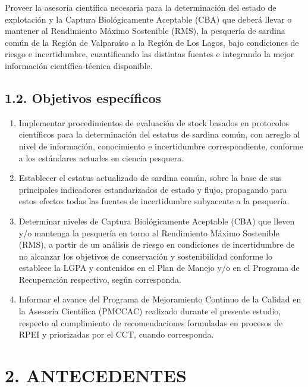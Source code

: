\documentclass[
  spanish,
]{article}
\begin{document}
Proveer la asesoría científica necesaria para la determinación del
estado de explotación y la Captura Biológicamente Aceptable (CBA) que
deberá llevar o mantener al Rendimiento Máximo Sostenible (RMS), la
pesquería de sardina común de la Región de Valparaíso a la Región de Los
Lagos, bajo condiciones de riesgo e incertidumbre, cuantificando las
distintas fuentes e integrando la mejor información científica-técnica
disponible.

\hypertarget{objetivos-especuxedficos}{%
\subsection{1.2. Objetivos específicos}\label{objetivos-especuxedficos}}

\begin{enumerate}
\def\labelenumi{\arabic{enumi}.}
\item
  Implementar procedimientos de evaluación de stock basados en
  protocolos científicos para la determinación del estatus de sardina
  común, con arreglo al nivel de información, conocimiento e
  incertidumbre correspondiente, conforme a los estándares actuales en
  ciencia pesquera.
\item
  Establecer el estatus actualizado de sardina común, sobre la base de
  sus principales indicadores estandarizados de estado y flujo,
  propagando para estos efectos todas las fuentes de incertidumbre
  subyacente a la pesquería.
\item
  Determinar niveles de Captura Biológicamente Aceptable (CBA) que
  lleven y/o mantenga la pesquería en torno al Rendimiento Máximo
  Sostenible (RMS), a partir de un análisis de riesgo en condiciones de
  incertidumbre de no alcanzar los objetivos de conservación y
  sostenibilidad conforme lo establece la LGPA y contenidos en el Plan
  de Manejo y/o en el Programa de Recuperación respectivo, según
  corresponda.
\item
  Informar el avance del Programa de Mejoramiento Continuo de la Calidad
  en la Asesoría Científica (PMCCAC) realizado durante el presente
  estudio, respecto al cumplimiento de recomendaciones formuladas en
  procesos de RPEI y priorizadas por el CCT, cuando corresponda.
\end{enumerate}

\pagebreak
\normalsize

\hypertarget{antecedentes}{%
\section{2. ANTECEDENTES}\label{antecedentes}}
\end{document}
